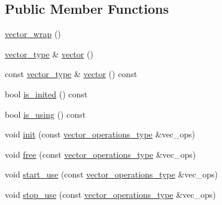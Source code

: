 \subsection*{Public Member Functions}
\begin{DoxyCompactItemize}
\item 
\hyperlink{structnumerical__algos_1_1detail_1_1vector__wrap_a950c09e9822e14203df43cfa5b4b0286}{vector\-\_\-wrap} ()
\item 
\hyperlink{structnumerical__algos_1_1detail_1_1vector__wrap_ad1b05447249f58553a35e12c23cb3e12}{vector\-\_\-type} \& \hyperlink{structnumerical__algos_1_1detail_1_1vector__wrap_ae2766762eb55c4ca127025cf6697ac00}{vector} ()
\item 
const \hyperlink{structnumerical__algos_1_1detail_1_1vector__wrap_ad1b05447249f58553a35e12c23cb3e12}{vector\-\_\-type} \& \hyperlink{structnumerical__algos_1_1detail_1_1vector__wrap_a3c6e221436d91e003bdf2d00ad276c0f}{vector} () const 
\item 
bool \hyperlink{structnumerical__algos_1_1detail_1_1vector__wrap_ae792b1f6de8724a55efa781d0d5886bc}{is\-\_\-inited} () const 
\item 
bool \hyperlink{structnumerical__algos_1_1detail_1_1vector__wrap_aa9e007c01ccbbfd220a46b3fb7571ab6}{is\-\_\-using} () const 
\item 
void \hyperlink{structnumerical__algos_1_1detail_1_1vector__wrap_a1d792611e3fcc3e5cefd650255389114}{init} (const \hyperlink{structnumerical__algos_1_1detail_1_1vector__wrap_aec858386dcc9cf18fdedd2ab4a606217}{vector\-\_\-operations\-\_\-type} \&vec\-\_\-ops)
\item 
void \hyperlink{structnumerical__algos_1_1detail_1_1vector__wrap_a2f1dfccc7a88f61f80f2b2e7862c59c5}{free} (const \hyperlink{structnumerical__algos_1_1detail_1_1vector__wrap_aec858386dcc9cf18fdedd2ab4a606217}{vector\-\_\-operations\-\_\-type} \&vec\-\_\-ops)
\item 
void \hyperlink{structnumerical__algos_1_1detail_1_1vector__wrap_a722f975322bb76f58daf6ef6186fd478}{start\-\_\-use} (const \hyperlink{structnumerical__algos_1_1detail_1_1vector__wrap_aec858386dcc9cf18fdedd2ab4a606217}{vector\-\_\-operations\-\_\-type} \&vec\-\_\-ops)
\item 
void \hyperlink{structnumerical__algos_1_1detail_1_1vector__wrap_a805fdd9a15d2209223ae2fac71df1fcf}{stop\-\_\-use} (const \hyperlink{structnumerical__algos_1_1detail_1_1vector__wrap_aec858386dcc9cf18fdedd2ab4a606217}{vector\-\_\-operations\-\_\-type} \&vec\-\_\-ops)
\end{DoxyCompactItemize}
